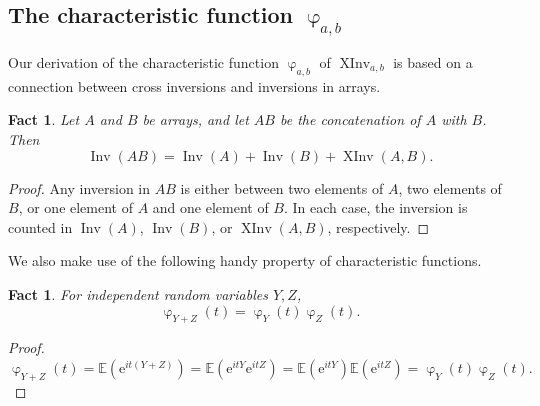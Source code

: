 \documentclass[11pt]{article}
\numberwithin{equation}{section}
\newtheorem{fact}[theorem]{Fact}
\theoremstyle{definition}
\theoremstyle{plain}
\newcommand{\eee}{\mathrm e}
\newcommand{\Expect}{\mathbb{E}}
\newcommand{\XInvD}{\XInv}
\DeclareMathOperator{\charfn}{\varphi}
\DeclareMathOperator{\Inv}{Inv}
\DeclareMathOperator{\XInv}{XInv}
\begin{document}
\subsection{The characteristic function \texorpdfstring{$\charfn_{a,b}$}{phi a,b}}
\label{sec:characteristic}

Our derivation of the characteristic function $\charfn_{a,b}$ of $\XInvD_{a,b}$ is based on a connection between cross inversions and inversions in arrays.
\begin{fact}
    \label{fact:cross-inversion-property}
    Let $A$ and $B$ be arrays, and let $AB$ be the concatenation of $A$ with $B$. Then
    \[\Inv(AB)=\Inv(A)+\Inv(B)+\XInv(A,B). \]
\end{fact}
\begin{proof}
    Any inversion in $AB$ is either between two elements of $A$, two elements of $B$, or one element of $A$ and one element of $B$. In each case, the inversion is counted in $\Inv(A)$, $\Inv(B)$, or $\XInv(A,B)$, respectively.
\end{proof}

We also make use of the following handy property of characteristic functions.
\begin{fact}
    \label{fact:charfn-mult}
    For independent random variables $Y,Z$,
    \[\charfn_{Y+Z}(t)=\charfn_Y(t)\charfn_Z(t). \]
\end{fact}
\begin{proof}
%
\quad
$ \charfn_{Y+Z}(t)=\Expect(\eee^{it(Y+Z)})=\Expect(\eee^{itY}\eee^{itZ})=\Expect(\eee^{itY})\Expect(\eee^{itZ})=\charfn_Y(t)\charfn_Z(t). $   %
\end{proof}
%
\end{document}
